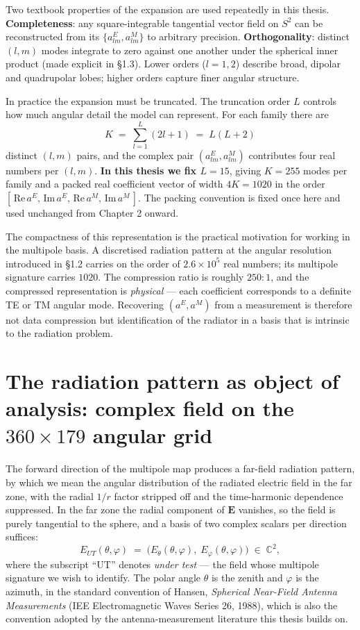 \documentclass[11pt,a4paper]{report}
\begin{document}
Two textbook properties of the expansion are used repeatedly in this thesis.
\textbf{Completeness}: any square-integrable tangential vector field on $S^2$ can be
reconstructed from its $\{a^E_{lm}, a^M_{lm}\}$ to arbitrary precision.
\textbf{Orthogonality}: distinct $(l,m)$ modes integrate to zero against one another
under the spherical inner product (made explicit in \S1.3). Lower orders ($l=1, 2$)
describe broad, dipolar and quadrupolar lobes; higher orders capture finer angular
structure.

In practice the expansion must be truncated. The truncation order $L$ controls how
much angular detail the model can represent. For each family there are
\[
K \;=\; \sum_{l=1}^{L}(2l+1) \;=\; L(L+2)
\]
distinct $(l,m)$ pairs, and the complex pair $(a^E_{lm}, a^M_{lm})$ contributes four
real numbers per $(l,m)$. \textbf{In this thesis we fix $L=15$}, giving $K=255$ modes
per family and a packed real coefficient vector of width $4K=1020$ in the order
$[\,\mathrm{Re}\,a^E,\,\mathrm{Im}\,a^E,\,\mathrm{Re}\,a^M,\,\mathrm{Im}\,a^M\,]$. The
packing convention is fixed once here and used unchanged from Chapter 2 onward.

The compactness of this representation is the practical motivation for working in the
multipole basis. A discretised radiation pattern at the angular resolution introduced
in \S1.2 carries on the order of $2.6\times 10^5$ real numbers; its multipole
signature carries $1020$. The compression ratio is roughly $250{:}1$, and the
compressed representation is \emph{physical} --- each coefficient corresponds to a
definite TE or TM angular mode. Recovering $(a^E, a^M)$ from a measurement is
therefore not data compression but identification of the radiator in a basis that is
intrinsic to the radiation problem.
\section{\texorpdfstring{The radiation pattern as object of analysis: complex field on the $360 \times 179$ angular grid}{The radiation pattern as object of analysis: complex field on the 360 x 179 angular grid}}

The forward direction of the multipole map produces a far-field radiation pattern,
by which we mean the angular distribution of the radiated electric field in the far
zone, with the radial $1/r$ factor stripped off and the time-harmonic dependence
suppressed. In the far zone the radial component of $\mathbf E$ vanishes, so the
field is purely tangential to the sphere, and a basis of two complex scalars per
direction suffices:
\[
E_{UT}(\theta,\varphi) \;=\;\bigl(E_\theta(\theta,\varphi),\; E_\varphi(\theta,\varphi)\bigr) \;\in\; \mathbb{C}^2,
\]
where the subscript \enquote{UT} denotes \emph{under test} --- the field whose
multipole signature we wish to identify. The polar angle $\theta$ is the zenith and
$\varphi$ is the azimuth, in the standard convention of Hansen,
\emph{Spherical Near-Field Antenna Measurements} (IEE Electromagnetic Waves Series 26,
1988), which is also the convention adopted by the antenna-measurement literature
this thesis builds on.
\end{document}
